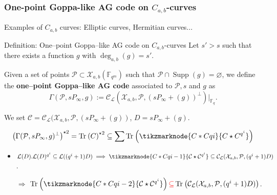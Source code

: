 \documentclass[
10pt, %
%
aspectratio=169, %
]{beamer}
\theoremstyle{plain}%
\theoremstyle{definition}
\theoremstyle{remark}
\newcommand{\calP}{\mathcal{P}}
\newcommand{\calL}{\mathcal{L}}
\newcommand{\calC}{\mathcal{C}}
\newcommand{\calX}{\mathcal{X}}
\newcommand{\fq}{\mathbb{F}_{q}}
\newcommand{\F}{\mathbb{F}}
\newcommand{\Tr}[1]{\operatorname{Tr}_{}\left(#1\right)}
\newcommand{\Supp}{\operatorname{Supp}}
\newcommand{\GRS}{\operatorname{\mathsf{GRS}}}
\newcommand{\degab}[1]{\deg_{a,b}\left(#1\right)}
\newcommand\highlightnode[2]{ %
	\node (#1-frame)[rounded corners,fit=(#1),inner sep=2pt,fill=#2,fill opacity=0.17] {};
}
\begin{document}
\begin{frame}
\frametitle{One-point Goppa-like AG code on $C_{a,b}$-curves}
Examples of $C_{a,b}$ curves: Elliptic curves, Hermitian curves...
\begin{block}{Definition: One--point Goppa--like AG code on $C_{a,b}$-curves}
	Let $s'>s$ such that there exists a function $g$ with $\degab{g}=s'$.
	
	Given a set of points  $\calP \subset \calX_{a,b}(\F_{q^m})$ such that $\calP \cap \Supp(g) = \varnothing$, we define the \textbf{one--point Goppa--like AG code} associated to $\calP,s$ and $g$ as 
	\[\Gamma(\calP,sP_\infty,g) := \calC_{\calL}(\calX_{a,b},\calP,(sP_\infty+(g))^{\perp})|_{\fq}.\]
\end{block}
	We set $\calC = \calC_{\calL}(\calX_{a,b},\calP,(sP_\infty+(g))$, $D = sP_\infty+(g)$.

\[\left(\Gamma(\calP,sP_\infty,g)^\perp\right)^{\star 2} = \Tr{C}^{\star 2} \subseteq \sum \Tr{\tikzmarknode{C*Cqi}{C \star C^{q^i}}} \]

	
\begin{itemize}
	\item $\calL(D).\calL(D)^{q^i}\subseteq \calL((q^i +1)D) \implies \tikzmarknode{C*Cqi-1}{\calC\star\calC^{q^i}} \subseteq \calC_{\calL}(\calX_{a,b},\calP,(q^i +1)D)$.
	\item[$\Rightarrow$] $\Tr{\tikzmarknode{C*Cqi-2}{\calC\star\calC^{q^i}}} \textcolor{red}{\subseteq} \Tr{\calC_{\calL}(\calX_{a,b},\calP,(q^i +1)D)}$.
\end{itemize}




\end{frame}
\end{document}
